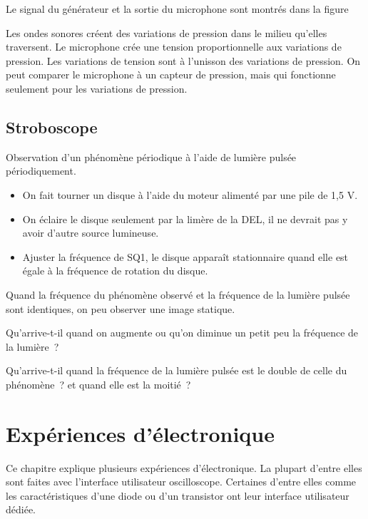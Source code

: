 \documentclass[a4paper,12pt,french]{sphinxmanual}
\let\sphinxpxdimen\pdfpxdimen\else\newdimen\sphinxpxdimen
\begin{document}

Le signal du générateur et la sortie du microphone sont montrés dans la
figure

Les ondes sonores créent des variations de pression dans le milieu
qu’elles traversent. Le microphone crée une tension proportionnelle aux
variations de pression. Les variations de tension sont à l’unisson des
variations de pression. On peut comparer le microphone à un capteur de
pression, mais qui fonctionne seulement pour les variations de pression.


\section{Stroboscope}
\label{\detokenize{2.21:stroboscope}}\label{\detokenize{2.21::doc}}

Observation d’un phénomène périodique à l’aide de lumière pulsée périodiquement.


\noindent\sphinxincludegraphics[width=300\sphinxpxdimen]{{stroboscope}.pdf}
\begin{itemize}
\item {} 
On fait tourner un disque à l’aide du moteur alimenté par une pile de 1,5 V.

\item {} 
On éclaire le disque seulement par la limère de la DEL, il ne devrait
pas y avoir d’autre source lumineuse.

\item {} 
Ajuster la fréquence de SQ1, le disque apparaît stationnaire quand elle est
égale à la fréquence de rotation du disque.

\end{itemize}


Quand la fréquence du phénomène observé et la fréquence de la lumière pulsée
sont identiques, on peu observer une image statique.

Qu’arrive-t-il quand on augmente ou qu’on diminue un petit peu la fréquence de
la lumière ?

Qu’arrive-t-il quand la fréquence de la lumière pulsée est le double de
celle du phénomène ? et quand elle est la moitié ?


\chapter{Expériences d’électronique}
\label{\detokenize{index:experiences-d-electronique}}
Ce chapitre explique plusieurs expériences d’électronique. La plupart
d’entre elles sont faites avec l’interface utilisateur
oscilloscope. Certaines d’entre elles comme les caractéristiques d’une
diode ou d’un transistor ont leur interface utilisateur dédiée.
\end{document}
